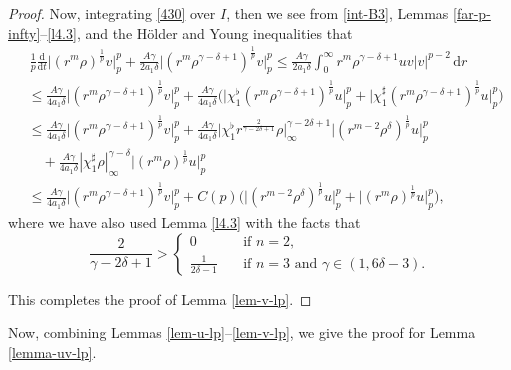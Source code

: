\documentclass[11pt,reqno]{amsart}
\numberwithin{rk}{section}
\numberwithin{prop}{section}
\numberwithin{mydef}{section}
\numberwithin{lem}{section}
\numberwithin{equation}{section}
\numberwithin{thm}{section}
\begin{document}
\begin{proof}
Now, integrating \eqref{430} over $I$, then we see  from \eqref{int-B3}, Lemmas \ref{far-p-infty}--\ref{l4.3}, and the H\"older and Young inequalities that
\begin{equation*}
\begin{aligned}
&\,\frac{1}{p}\frac{\mathrm{d}}{\mathrm{d}t}\big|(r^m\rho)^\frac{1}{p} v\big|_{p}^{p}+\frac{A\gamma}{2a_1\delta}\big|(r^m\rho^{\gamma-\delta+1})^\frac{1}{p} v\big|_{p}^{p}\leq \frac{A\gamma}{2a_1\delta} \int_0^\infty r^m\rho^{\gamma-\delta+1} uv|v|^{p-2}\,\mathrm{d}r\\
&\leq \frac{A\gamma}{4a_1\delta}\big|(r^m\rho^{\gamma-\delta+1})^\frac{1}{p} v\big|_{p}^{p}+\frac{A\gamma}{4a_1\delta}\big(\big|\chi_1^\flat (r^m\rho^{\gamma-\delta+1})^\frac{1}{p}u\big|_p^p+\big|\chi_1^\sharp (r^m\rho^{\gamma-\delta+1})^\frac{1}{p} u\big|_p^p\big)\\
&\leq \frac{A\gamma}{4a_1\delta}\big|(r^m\rho^{\gamma-\delta+1})^\frac{1}{p} v\big|_{p}^{p}+ \frac{A\gamma}{4a_1\delta}\big|\chi_1^\flat r^\frac{2}{\gamma-2\delta+1}\rho\big|_\infty^{\gamma-2\delta+1} \big|(r^{m-2}\rho^\delta)^\frac{1}{p} u\big|_{p}^{p}\\
&\quad +\frac{A\gamma}{4a_1\delta}|\chi_1^\sharp \rho|_\infty^{\gamma-\delta} \big|(r^m\rho)^\frac{1}{p} u\big|_{p}^{p}\\
&\leq \frac{A\gamma}{4a_1\delta}\big|(r^m\rho^{\gamma-\delta+1})^\frac{1}{p} v\big|_{p}^{p}+C(p)\big(\big|(r^{m-2}\rho^\delta)^\frac{1}{p} u\big|_{p}^{p}+\big|(r^m\rho)^\frac{1}{p} u\big|_{p}^{p}\big),
\end{aligned}
\end{equation*}
where we have also used Lemma \ref{l4.3} with the facts that
\begin{equation*}
\frac{2}{\gamma-2\delta+1}>
\begin{cases}
0 \quad&\text{if $n=2$},\\
\frac{1}{2\delta-1}\quad &\text{if $n=3$ \ and \  $\gamma\in(1,6\delta-3)$}.   
\end{cases}
\end{equation*}


This completes the proof of Lemma \ref{lem-v-lp}.
\end{proof}

Now, combining Lemmas \ref{lem-u-lp}--\ref{lem-v-lp}, we give the proof for Lemma \ref{lemma-uv-lp}.
\end{document}
